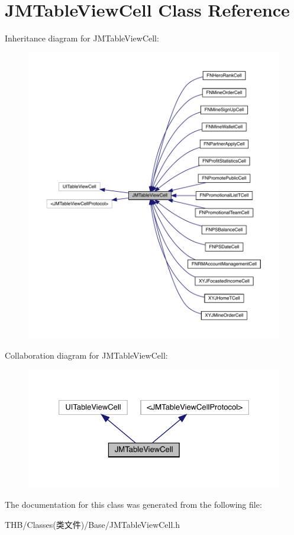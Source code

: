 \hypertarget{interface_j_m_table_view_cell}{}\section{J\+M\+Table\+View\+Cell Class Reference}
\label{interface_j_m_table_view_cell}


Inheritance diagram for J\+M\+Table\+View\+Cell\+:\nopagebreak
\begin{figure}[H]
\begin{center}
\leavevmode
\includegraphics[width=350pt]{interface_j_m_table_view_cell__inherit__graph}
\end{center}
\end{figure}


Collaboration diagram for J\+M\+Table\+View\+Cell\+:\nopagebreak
\begin{figure}[H]
\begin{center}
\leavevmode
\includegraphics[width=326pt]{interface_j_m_table_view_cell__coll__graph}
\end{center}
\end{figure}


The documentation for this class was generated from the following file\+:\begin{DoxyCompactItemize}
\item 
T\+H\+B/\+Classes(类文件)/\+Base/J\+M\+Table\+View\+Cell.\+h\end{DoxyCompactItemize}
